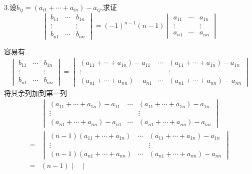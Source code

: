 3.设$b_{ij}=\left(a_{i1}+\cdots
+a_{in}\right)-a_{ij}$,求证
\[
\begin{vmatrix}
	b_{11} & \cdots & b_{1n}\\
	\vdots &&\vdots\\
	b_{n1}&\cdots &b_{nn}
\end{vmatrix}
=\left(-1\right)^{n-1}\left(n-1\right)
\begin{vmatrix}
	a_{11} & \cdots & a_{1n}\\
	\vdots &&\vdots\\
	a_{n1}&\cdots &a_{nn}
\end{vmatrix}
\]
\begin{Proof}
	容易有
	\begin{align*}
		\begin{vmatrix}
			b_{11} & \cdots & b_{1n}\\
	\vdots &&\vdots\\
	b_{n1}&\cdots &b_{nn}
		\end{vmatrix}=
		\begin{vmatrix}
			\left(a_{11}+\cdots
			+a_{1n}\right)-a_{11}
			&\cdots&\left(a_{11}+
			\cdots
			+a_{1n}\right)-a_{1n}\\
			\vdots&&\vdots\\
			\left(a_{n1}+\cdots
			+a_{nn}\right)-a_{n1}
			&\cdots&\left(a_{n1}+
			\cdots
			+a_{nn}\right)-a_{nn}
		\end{vmatrix}
	\end{align*}
	将其余列加到第一列
	\begin{align*}
		&\begin{vmatrix}
			\left(a_{11}+\cdots
			+a_{1n}\right)-a_{11}
			&\cdots&\left(a_{11}+
			\cdots
			+a_{1n}\right)-a_{1n}\\
			\vdots&&\vdots\\
			\left(a_{n1}+\cdots
			+a_{nn}\right)-a_{n1}
			&\cdots&\left(a_{n1}+
			\cdots
			+a_{nn}\right)-a_{nn}
		\end{vmatrix}\\
		=&
		\begin{vmatrix}
			\left(n-1\right)\left(a_{11}+\cdots
			+a_{1n}\right)
			&\cdots&\left(a_{11}+
			\cdots
			+a_{1n}\right)-a_{1n}\\
			\vdots&&\vdots\\
			\left(n-1\right)\left(a_{n1}+\cdots
			+a_{nn}\right)
			&\cdots&\left(a_{n1}+
			\cdots
			+a_{nn}\right)-a_{nn}
		\end{vmatrix}
		\\
		=&\left(n-1\right)
		\begin{vmatrix}

\end{vmatrix}
\end{align*}
\end{Proof}
